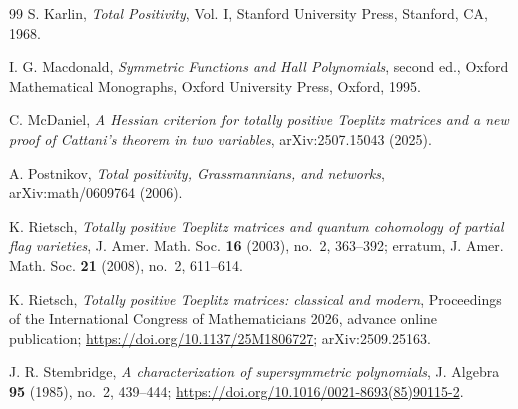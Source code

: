 \documentclass{amsart}
\numberwithin{equation}{section}
\theoremstyle{definition}
\theoremstyle{remark}
\begin{document}
\begin{thebibliography}{99}
S. Karlin,
\emph{Total Positivity}, Vol. I,
Stanford University Press, Stanford, CA, 1968.

I. G. Macdonald,
\emph{Symmetric Functions and Hall Polynomials}, second ed.,
Oxford Mathematical Monographs, Oxford University Press, Oxford, 1995.

C. McDaniel,
\emph{A Hessian criterion for totally positive Toeplitz matrices and a new proof of Cattani's theorem in two variables},
arXiv:2507.15043 (2025).

A. Postnikov,
\emph{Total positivity, Grassmannians, and networks},
arXiv:math/0609764 (2006).

K. Rietsch,
\emph{Totally positive Toeplitz matrices and quantum cohomology of partial flag varieties},
J. Amer. Math. Soc. \textbf{16} (2003), no.~2, 363--392;
erratum, J. Amer. Math. Soc. \textbf{21} (2008), no.~2, 611--614.

K. Rietsch,
\emph{Totally positive Toeplitz matrices: classical and modern},
Proceedings of the International Congress of Mathematicians 2026, advance online publication;
\url{https://doi.org/10.1137/25M1806727}; arXiv:2509.25163.

J. R. Stembridge,
\emph{A characterization of supersymmetric polynomials},
J. Algebra \textbf{95} (1985), no.~2, 439--444;
\url{https://doi.org/10.1016/0021-8693(85)90115-2}.

\end{thebibliography}
\end{document}
